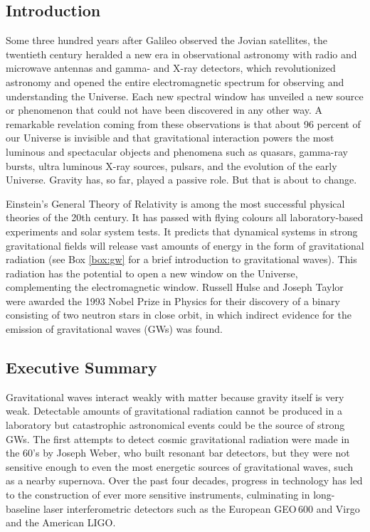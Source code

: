 \def\gsim{\mathrel{
\rlap{\raise 0.511ex \hbox{$>$}}{\lower 0.511ex
\hbox{$\sim$}}}}
\def\lsim{\mathrel{
\rlap{\raise 0.511ex \hbox{$<$}}{\lower 0.511ex
\hbox{$\sim$}}}}

\FloatBarrier
\subsection{Introduction}
Some three hundred years after Galileo observed the Jovian
satellites, the twentieth century heralded a new era in
observational astronomy with  radio and microwave antennas and
gamma- and X-ray detectors, which revolutionized astronomy and
opened the entire electromagnetic spectrum for observing
and understanding the Universe. Each new spectral window
has unveiled a new source or phenomenon that could not have been
discovered in any other way. A remarkable revelation
coming from these observations is that about 96 percent of
our Universe is invisible and that gravitational interaction
powers the most luminous and spectacular objects and phenomena
such as quasars, gamma-ray bursts, ultra luminous X-ray sources,
pulsars, and the evolution of the early Universe. Gravity has,
so far, played a passive role. But that is about to change.

Einstein's General Theory of Relativity is among the most 
successful physical theories of the 20th century. It has
passed with flying colours all laboratory-based experiments
and solar system tests.  It predicts that dynamical systems 
in strong gravitational fields will release vast amounts of 
energy in the form of gravitational radiation (see Box 
\ref{box:gw} for a brief introduction to gravitational waves).
This radiation has the potential to open a new window on the Universe, 
complementing the electromagnetic window. Russell Hulse 
and Joseph Taylor were awarded the 1993 Nobel Prize in Physics for 
their discovery of a binary consisting of two neutron stars in 
close orbit, in which indirect evidence for the emission of
gravitational waves (GWs) was found. 

\FloatBarrier
\subsection{Executive Summary}
Gravitational waves interact weakly with matter because gravity 
itself is very weak.  Detectable amounts of gravitational 
radiation cannot be produced in a laboratory but catastrophic 
astronomical events could be the source of strong GWs.
The first attempts to detect cosmic gravitational radiation were made in 
the 60's by Joseph Weber, who built resonant bar detectors, but they were 
not sensitive enough to even the most energetic sources of gravitational 
waves, such as a nearby supernova.  Over the past four 
decades, progress in technology has led to the construction of 
ever more sensitive instruments, culminating in long-baseline
laser interferometric detectors such as the
European GEO\,600 and Virgo and the American LIGO.

